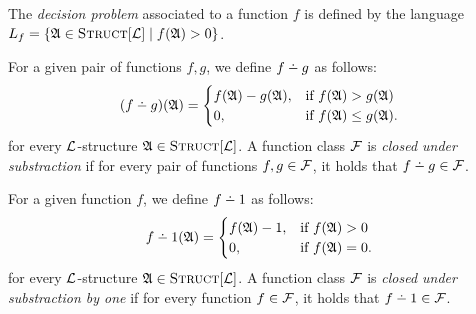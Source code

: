 \documentclass[12pt]{article}
\def\dotminus{\mathbin{\ooalign{\hss\raise1ex\hbox{.}\hss\cr
  \mathsurround=0pt$-$}}}
\def\Truc{\textsc{Struct}[\L]}
\def\A{{\frak A}}
\def\F{{\cal F}}
\def\L{{\cal L}}
\begin{document}
The {\em decision problem} associated to a function $f$ is defined by the language $L_f = \{\A \in \Truc \mid f(\A) > 0\}$.



For a given pair of functions $f,g$, we define $f \dotminus g$ as follows:
\begin{eqnarray*}
(f \dotminus g)(\A) =
\begin{cases}
f(\A)-g(\A), & \text{if }f(\A)>g(\A) \\
0, & \text{if }f(\A) \leq g(\A).
\end{cases}
\end{eqnarray*}
for every $\L$-structure $\A \in \Truc$. A function class $\F$ is {\em closed under substraction} if for every pair of functions $f,g \in \F$, it holds that $f \dotminus g \in \F$.





For a given function $f$, we define $f \dotminus 1$ as follows:
\begin{eqnarray*}
f \dotminus 1(\A) =
\begin{cases}
f(\A)-1, & \text{if }f(\A) > 0 \\
0, & \text{if }f(\A) = 0.
\end{cases}
\end{eqnarray*}
for every $\L$-structure $\A \in \Truc$. A function class $\F$ is {\em closed under substraction by one} if for every function $f \in \F$, it holds that $f \dotminus 1 \in \F$.





\end{document}
